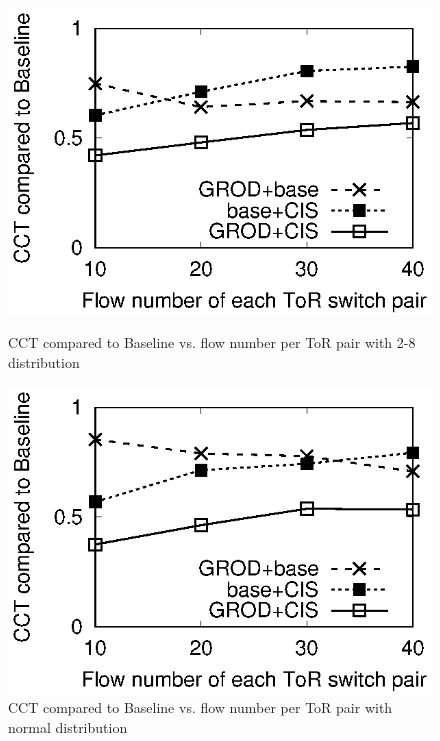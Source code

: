 \begin{figure}
\begin{minipage}[c]{0.23\textwidth}
\includegraphics[width=1\textwidth]{28_flow_cct.eps}
\caption{CCT compared to Baseline vs. flow number per ToR pair with 2-8 distribution}\label{fig:28_flow_cct}
\end{minipage}
\hspace{1mm}
\begin{minipage}[c]{0.23\textwidth}
\centering

\includegraphics[width=1\textwidth]{normal_flow_cct.eps}
\caption{CCT compared to Baseline vs. flow number per ToR pair with normal distribution}\label{fig:normal_flow_cct}
\end{minipage}
\hspace{1mm}
\begin{minipage}[c]{0.23\textwidth}
\centering


\end{minipage}
\end{figure}
